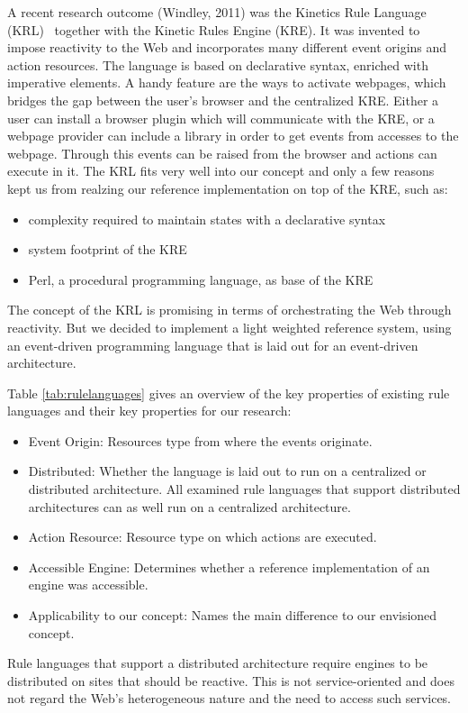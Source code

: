 A recent research outcome (Windley, 2011) was the \textrm{Kinetics Rule Language} (\textrm{KRL})~\cite{bookTheLiveWeb} together with the \textrm{Kinetic Rules Engine} (\textrm{KRE}).
It was invented to impose reactivity to the Web and incorporates many different event origins and action resources.
The language is based on declarative syntax, enriched with imperative elements.
A handy feature are the ways to activate webpages, which bridges the gap between the user's browser and the centralized \textrm{KRE}.
Either a user can install a browser plugin which will communicate with the \textrm{KRE}, or a webpage provider can include a library in order to get events from accesses to the webpage.
Through this events can be raised from the browser and actions can execute in it.
The \textrm{KRL} fits very well into our concept and only a few reasons kept us from realzing our reference implementation on top of the \textrm{KRE}, such as:
\begin{itemize}
  \item complexity required to maintain states with a declarative syntax 
  \item system footprint of the \textrm{KRE}
  \item \textrm{Perl}, a procedural programming language, as base of the \textrm{KRE}
\end{itemize}
The concept of the \textrm{KRL} is promising in terms of orchestrating the Web through reactivity.
But we decided to implement a light weighted reference system, using an event-driven programming language that is laid out for an event-driven architecture. 

Table \ref{tab:rulelanguages} gives an overview of the key properties of existing rule languages and their key properties for our research:
\begin{itemize}
  \item \textrm{Event Origin}: Resources type from where the events originate.
  \item \textrm{Distributed}: Whether the language is laid out to run on a centralized or distributed architecture. All examined rule languages that support distributed architectures can as well run on a centralized architecture.
  \item \textrm{Action Resource}: Resource type on which actions are executed.
  \item \textrm{Accessible Engine}: Determines whether a reference implementation of an engine was accessible.
  \item \textrm{Applicability to our concept}: Names the main difference to our envisioned concept.
\end{itemize}
Rule languages that support a distributed architecture require engines to be distributed on sites that should be reactive.
This is not service-oriented and does not regard the Web's heterogeneous nature and the need to access such services.

